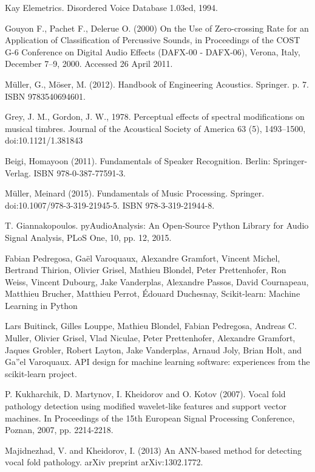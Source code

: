\documentclass[conference]{IEEEtran}
\begin{document}
\begin{thebibliography}{00}
Kay Elemetrics. Disordered Voice Database 1.03ed, 1994.	

 Gouyon F., Pachet F., Delerue O. (2000) On the Use of Zero-crossing Rate for an Application of Classification of Percussive Sounds, in Proceedings of the COST G-6 Conference on Digital Audio Effects (DAFX-00 - DAFX-06), Verona, Italy, December 7–9, 2000. Accessed 26 April 2011.

Müller, G., Möser, M. (2012). Handbook of Engineering Acoustics. Springer. p. 7. ISBN 9783540694601.

Grey, J. M., Gordon, J. W., 1978. Perceptual effects of spectral modifications on musical timbres. Journal of the Acoustical Society of America 63 (5), 1493–1500, doi:10.1121/1.381843

Beigi, Homayoon (2011). Fundamentals of Speaker Recognition. Berlin: Springer-Verlag. ISBN 978-0-387-77591-3.

Müller, Meinard (2015). Fundamentals of Music Processing. Springer. doi:10.1007/978-3-319-21945-5. ISBN 978-3-319-21944-8.

T. Giannakopoulos. pyAudioAnalysis: An Open-Source Python Library for Audio Signal Analysis, PLoS One, 10, pp. 12, 2015.

Fabian Pedregosa, Gaël Varoquaux, Alexandre Gramfort, Vincent Michel, Bertrand Thirion, Olivier Grisel, Mathieu Blondel, Peter Prettenhofer, Ron Weiss, Vincent Dubourg, Jake Vanderplas, Alexandre Passos, David Cournapeau, Matthieu Brucher, Matthieu Perrot, Édouard Duchesnay, Scikit-learn: Machine Learning in Python

Lars Buitinck, Gilles Louppe, Mathieu Blondel, Fabian Pedregosa, Andreas C. Muller, Olivier Grisel, Vlad Niculae, Peter Prettenhofer, Alexandre Gramfort, Jaques Grobler, Robert Layton, Jake Vanderplas, Arnaud Joly, Brian Holt, and Ga''el Varoquaux. API design for machine learning software: experiences from the scikit-learn project.

P. Kukharchik, D. Martynov, I. Kheidorov and O. Kotov (2007). Vocal fold pathology detection using modified wavelet-like features and support vector machines. In Proceedings of the 15th European Signal Processing Conference, Poznan, 2007, pp. 2214-2218.

Majidnezhad, V. and Kheidorov, I. (2013) An ANN-based method for detecting vocal fold pathology. arXiv preprint arXiv:1302.1772.


\end{thebibliography}
\end{document}
